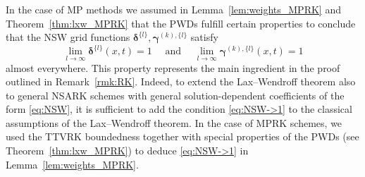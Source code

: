 \documentclass[final,11pt, times, linenumber, nopreprintline]{elsarticle}
\newcommand{\todo}[1]{{\Large \textcolor{red}{#1}}}
\renewcommand{\O}{\mathcal{O}}
\newcommand{\bU}{\bm U}
\newtheorem{thm}{Theorem}
\newtheorem{lem}[thm]{Lemma}
\begin{document}



\begin{rmk}
In the case of MP methods we assumed in Lemma~\ref{lem:weights_MPRK} and Theorem~\ref{thm:lxw_MPRK} that the PWDs fulfill certain properties to conclude that the NSW grid functions $\bm{\delta}^{\{l\}},\bm\gamma^{(k),\{l\}}$ satisfy
\begin{equation}\label{eq:NSW->1}
    \lim_{l\to\infty}\bm{\delta}^{\{l\}}(x,t)=1\quad \text{ and }\quad \lim_{l\to\infty}\bm\gamma^{(k),\{l\}}(x,t)=1
\end{equation}almost everywhere. This property represents the main ingredient in the proof outlined in Remark~\ref{rmk:RK}. Indeed, to extend the Lax--Wendroff theorem also to general NSARK schemes with general solution-dependent coefficients of the form \eqref{eq:NSW}, it is sufficient to add the condition \eqref{eq:NSW->1} to the classical assumptions of the Lax--Wendroff theorem. In the case of MPRK schemes, we used the TTVRK boundedness together with special properties of the PWDs (see Theorem~\ref{thm:lxw_MPRK}) to deduce \eqref{eq:NSW->1} in Lemma~\ref{lem:weights_MPRK}.
\end{rmk}
\end{document}
